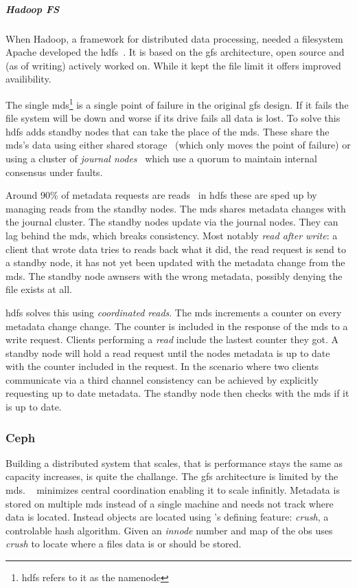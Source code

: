 \subparagraph*{Hadoop FS}
When Hadoop, a framework for distributed data processing, needed a filesystem Apache developed the \ac{hdfs}~\cite{hdfs}. It is based on the \ac{gfs} architecture, open source and (as of writing) actively worked on. While it kept the file limit it offers improved availibility.

The single \ac{mds}\footnote{\ac{hdfs} refers to it as the namenode} is a single point of failure in the original \ac{gfs} design. If it fails the file system will be down and worse if its drive fails all data is lost. To solve this \ac{hdfs} adds standby nodes that can take the place of the \ac{mds}. These share the \ac{mds}'s data using either shared storage~\cite{hdfs_ha_nfs} (which only moves the point of failure) or using a cluster of \textit{journal nodes}~\cite{hdfs_ha_q} which use a quorum to maintain internal consensus under faults. 

Around 90\% of metadata requests are reads~\cite{hdfs_ha_reads} in \ac{hdfs} these are sped up by managing reads from the standby nodes. The \ac{mds} shares metadata changes with the journal cluster. The standby nodes update via the journal nodes. They can lag behind the \ac{mds}, which breaks consistency. Most notably \textit{read after write}: a client that wrote data tries to reads back what it did, the read request is send to a standby node, it has not yet been updated with the metadata change from the \ac{mds}. The standby node awnsers with the wrong metadata, possibly denying the file exists at all. 

\ac{hdfs} solves this using \textit{coordinated reads}. The \ac{mds} increments a counter on every metadata change change. The counter is included in the response of the \ac{mds} to a write request. Clients performing a \textit{read} include the lastest counter they got. A standby node will hold a read request until the nodes metadata is up to date with the counter included in the request. In the scenario where two clients communicate via a third channel consistency can be achieved by explicitly requesting up to date metadata. The standby node then checks with the \ac{mds} if it is up to date.

\subsubsection*{Ceph}
Building a distributed system that scales, that is performance stays the same as capacity increases, is quite the challange. The \ac{gfs} architecture is limited by the \acf{mds}. \ceph{}~\cite{ceph} minimizes central coordination enabling it to scale infinitly. Metadata is stored on multiple \ac{mds} instead of a single machine and needs not track where data is located. Instead objects are located using \ceph{}'s defining feature: \emph{\ac{crush}}, a controlable hash algorithm. Given an \textit{innode} number and map of the \ac{obs} \ceph{} uses \emph{\ac{crush}} to locate where a files data is or should be stored. 

